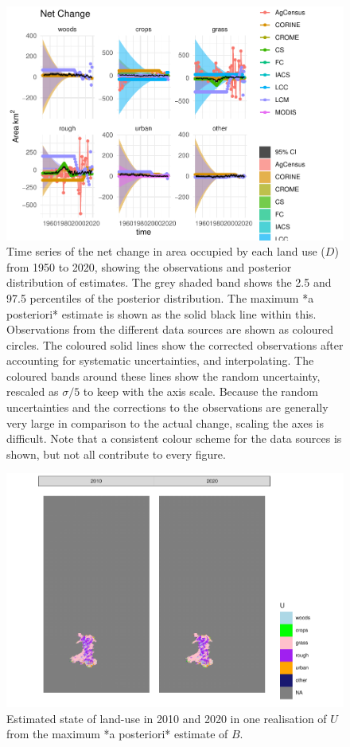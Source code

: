 \documentclass[
]{book}
\begin{document}
\begin{figure}
\includegraphics[width=1.3\linewidth]{Results_wa_files/figure-latex/plotD-1} \caption{ Time series of the net change in area occupied by each land use ($D$) from 1950 to 2020, showing the observations and posterior distribution of estimates. The grey shaded band shows the 2.5 and 97.5 percentiles of the posterior distribution. The maximum *a posteriori* estimate is shown as the solid black line within this. Observations from the different data sources are shown as coloured circles. The coloured solid lines show the corrected observations after accounting for systematic uncertainties, and interpolating. The coloured bands around these lines show the random uncertainty, rescaled as $\sigma /5$ to keep with the axis scale. Because the random uncertainties and the corrections to the observations are generally very large in comparison to the actual change, scaling the axes is difficult. Note that a consistent colour scheme for the data sources is shown, but not all contribute to every figure.}\label{fig:plotD}
\end{figure}

\begin{figure}
\includegraphics[width=1.3\linewidth]{Results_wa_files/figure-latex/plotUt-1} \caption{Estimated state of land-use in 2010 and 2020 in one realisation of $U$ from the maximum *a posteriori* estimate of $B$.}\label{fig:plotUt}
\end{figure}
\end{document}
